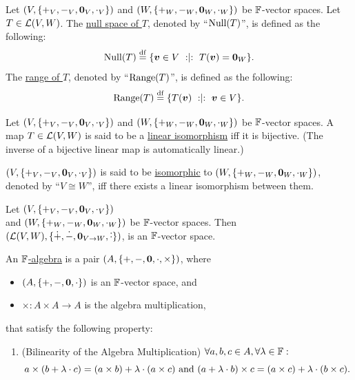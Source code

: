 \documentclass[11pt,reqno]{amsart}
\newcommand{\pwplus}{\mathbin{\dot{+}}}
\newcommand{\pwminus}{\mathbin{\dot{-}}}
\newcommand{\pwcdot}{\mathbin{\dot{\cdot}}}
\begin{document}
\begin{Def}
Let $\Br{V,\set{+_V,-_V,\bm0_V,\cdot_V}}$ and $\Br{W,\set{+_W,-_W,\bm0_W,\cdot_W}}$
be $\mathbb{F}$-vector spaces.
Let $T\in\mathcal{L}(V,W)$.
The \ul{null space of $T$}, denoted by ``$\Null{T}$'', is defined as the following:
\[\Null{T}\df\set{\bm v\in V\st T(\bm v)=\bm0_W}.\]
The \ul{range of $T$}, denoted by ``$\Range{T}$'', is defined as the following:
\[\Range{T}\df\set{T(\bm v)\st\bm v\in V}.\]
\end{Def}

\begin{Def}
Let $\Br{V,\set{+_V,-_V,\bm0_V,\cdot_V}}$ and $\Br{W,\set{+_W,-_W,\bm0_W,\cdot_W}}$
be $\mathbb{F}$-vector spaces.
A map $T\in\mathcal{L}(V,W)$ is said to be a
\ul{linear isomorphism} iff it is bijective.
(The inverse of a bijective linear map is automatically linear.)
\end{Def}

\begin{Def}
$\Br{V,\set{+_V,-_V,\bm0_V,\cdot_V}}$ is said to be
\ul{isomorphic} to $\Br{W,\set{+_W,-_W,\bm0_W,\cdot_W}}$,
denoted by ``$V\cong W$'', iff
there exists a linear isomorphism between them.
\end{Def}

\begin{Thm}
\label{thm:LVW-vec-space}
Let
$\Br{V,\set{+_V,-_V,\bm0_V,\cdot_V}}$\\ and $\Br{W,\set{+_W,-_W,\bm0_W,\cdot_W}}$
be $\mathbb{F}$-vector spaces.
Then $\Br{\L(V,W),\set{\pwplus,\pwminus,\bm0_{V\to W},\pwcdot}}$, is an $\mathbb{F}$-vector space.
\end{Thm}

\begin{Def}
An \ul{$\mathbb{F}$-algebra} is a pair
$\Br{A,\set{+,-,\bm0,\cdot,\times}}$, where
\begin{itemize}
\item $(A,\set{+,-,\bm0,\cdot})$ is an
$\mathbb{F}$-vector space, and
\item $\times:A\times A\to A$ is the algebra multiplication,
\end{itemize}
that satisfy the following property:
\begin{enumerate}
\item (Bilinearity of the Algebra Multiplication)
$\forall a,b,c\in A,\forall\lambda\in\mathbb{F}:$
\[a\times(b+\lambda\cdot c)=(a\times b)+\lambda\cdot(a\times c)
~\mathrm{and}~
(a+\lambda\cdot b)\times c=(a\times c)+\lambda\cdot(b\times c).
\]
\end{enumerate}
\end{Def}
\end{document}
